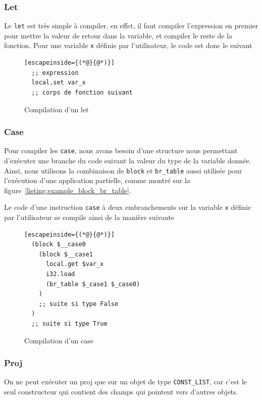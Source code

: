 \documentclass{rapportECL}
\begin{document}
\subsubsection{Let}

Le \verb|let| est très simple à compiler, en effet, il faut compiler l'expression en premier pour mettre la valeur de retour 
dans la variable, et compiler le reste de la fonction. Pour une variable \verb|x| définie par l'utilisateur, le code est donc le suivant

\begin{figure}[H]
	\begin{lstlisting}[escapeinside={(*@}{@*)}]
  ;; expression
  local.set var_x
  ;; corps de fonction suivant
	\end{lstlisting}
	\caption{Compilation d'un let}
	\label{listing:compile_let}
\end{figure}


\subsubsection{Case}

Pour compiler les \verb|case|, nous avons besoin d'une structure nous permettant d'exécuter une branche du code suivant la valeur du 
type de la variable donnée. Ainsi, nous utilisons la combinaison de \verb|block| et \verb|br_table| aussi utilisée pour l'exécution
d'une application partielle, comme montré sur la figure~\ref*{listing:example_block_br_table}.

Le code d'une instruction \verb|case| à deux embranchements sur la variable \verb|x| définie par l'utilisateur 
se compile ainsi de la manière suivante


\begin{figure}[H]
	\begin{lstlisting}[escapeinside={(*@}{@*)}]
  (block $__case0
    (block $__case1
      local.get $var_x
      i32.load
      (br_table $_case1 $_case0)
	)
    ;; suite si type False
  )
  ;; suite si type True
	\end{lstlisting}
	\caption{Compilation d'un case}
	\label{listing:compile_case}
\end{figure}

\subsubsection{Proj}

On ne peut exécuter un proj que sur un objet de type \verb|CONST_LIST|, car c'est le seul constructeur qui contient des champs qui
pointent vers d'autres objets.
\end{document}
